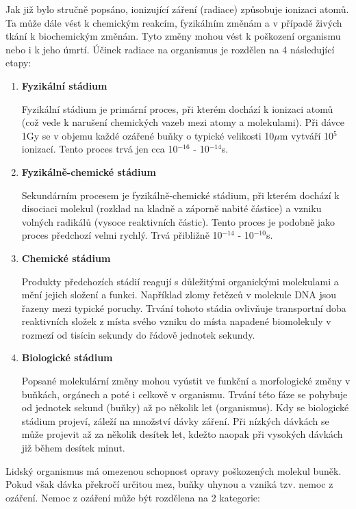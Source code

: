 Jak již bylo stručně popsáno, ionizující záření (radiace) způsobuje ionizaci atomů. Ta může dále vést k chemickým reakcím, fyzikálním změnám a v případě živých tkání k biochemickým změnám. Tyto změny mohou vést k poškození organismu nebo i k jeho úmrtí. Účinek radiace na organismus je rozdělen na 4 následující etapy: %

\begin{enumerate}
	\item \textbf{Fyzikální stádium}
	
		Fyzikální stádium je primární proces, při kterém dochází k ionizaci atomů (což vede k narušení chemických vazeb mezi atomy a molekulami). Při dávce 1Gy se v objemu každé ozářené buňky o typické velikosti 10$\mu$m vytváří 10$^5$ ionizací. Tento proces trvá jen cca 10$^{-16}$ - 10$^{-14}$s.
		
	\item \textbf{Fyzikálně-chemické stádium}
	
	Sekundárním procesem je fyzikálně-chemické stádium, při kterém dochází k disociaci molekul (rozklad na kladně a záporně nabité částice) a vzniku volných radikálů (vysoce reaktivních částic). Tento proces je podobně jako proces předchozí velmi rychlý. Trvá přibližně 10$^{-14}$ - 10$^{-10}$s.	 
	
	\item \textbf{Chemické stádium}
	
	Produkty předchozích stádií reagují s důležitými organickými molekulami a mění jejich složení a funkci. Například zlomy řetězců v molekule DNA jsou řazeny mezi typické poruchy. Trvání tohoto stádia ovlivňuje transportní doba reaktivních složek z místa svého vzniku do místa napadené biomolekuly v rozmezí od tisícin sekundy do řádově jednotek sekundy.
	
	\item \textbf{Biologické stádium}
	
	Popsané molekulární změny mohou vyústit ve funkční a morfologické změny v buňkách, orgánech a poté i celkově v organismu. Trvání této fáze se pohybuje od jednotek sekund (buňky) až po několik let (organismus). Kdy se biologické stádium projeví, záleží na množství dávky záření. Při nízkých dávkách se může projevit až za několik desítek let, kdežto naopak při vysokých dávkách již během desítek minut. 
\end{enumerate}

Lidský organismus má omezenou schopnost opravy poškozených molekul buněk. Pokud však dávka překročí určitou mez, buňky uhynou a vzniká tzv. nemoc z ozáření. 	%
Nemoc z ozáření může být rozdělena na 2 kategorie: %

